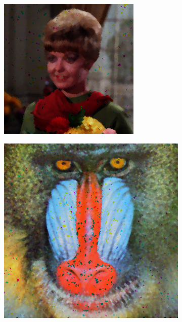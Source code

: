 \begin{subfigure}{0.9\textwidth}
\begin{subfigure}[t]{0.15\textwidth}
    \centering
  \end{subfigure}
\begin{subfigure}[t]{0.15\textwidth}
    \includegraphics[width=0.9\linewidth]{../images/outputs/denoise/oc/oc2.png}
    
    \centering
  \end{subfigure}
\begin{subfigure}[t]{0.15\textwidth}
    \includegraphics[width=0.9\linewidth]{../images/outputs/denoise/oc/oc3.png}
    

\end{subfigure}
\end{subfigure}
